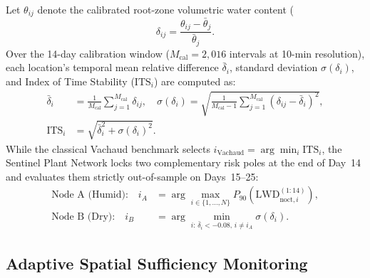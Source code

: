 \documentclass[10pt,twocolumn,a4paper]{article}
\begin{document}
Let $\theta_{ij}$ denote the calibrated root-zone volumetric water content (%
\begin{equation}
  \delta_{ij} = \frac{\theta_{ij} - \bar{\theta}_j}{\bar{\theta}_j}.
  \label{eq:rel_diff}
\end{equation}
Over the 14-day calibration window ($M_{\text{cal}} = 2,016$ intervals at 10-min resolution), each location's temporal mean relative difference $\bar{\delta}_i$, standard deviation $\sigma(\delta_i)$, and Index of Time Stability ($\mathrm{ITS}_i$) are computed as:
\begin{align}
  \bar{\delta}_i &= \frac{1}{M_{\text{cal}}}\sum_{j=1}^{M_{\text{cal}}} \delta_{ij}, \quad
  \sigma(\delta_i) = \sqrt{\frac{1}{M_{\text{cal}}-1}\sum_{j=1}^{M_{\text{cal}}}\left(\delta_{ij}-\bar{\delta}_i\right)^2}, \nonumber\\
  \mathrm{ITS}_i &= \sqrt{\bar{\delta}_i^2 + \sigma(\delta_i)^2}.
  \label{eq:its}
\end{align}
While the classical Vachaud benchmark selects $i_{\text{Vachaud}} = \arg\min_i \mathrm{ITS}_i$, the Sentinel Plant Network locks two complementary risk poles at the end of Day~14 and evaluates them strictly out-of-sample on Days~15--25:
\begin{align}
  \text{Node A (Humid):}\quad i_A &= \arg\max_{i \in \{1,\dots,N\}} P_{90}\!\left(\mathrm{LWD}_{\text{noct},i}^{(1:14)}\right), \label{eq:nodeA}\\
  \text{Node B (Dry):}\quad i_B &= \arg\min_{i:\,\bar{\delta}_i < -0.08,\, i \neq i_A} \sigma(\delta_i). \label{eq:nodeB}
\end{align}

\subsection{Adaptive Spatial Sufficiency Monitoring}
\end{document}

